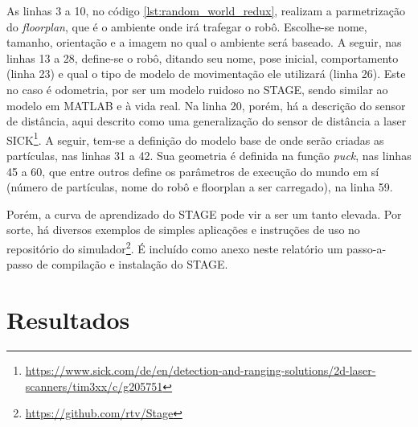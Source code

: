 \documentclass[
	12pt,				%
	openright,			%
	oneside,			%
	a4paper,			%
	english,			%
	french,				%
	spanish,			%
	brazil,				%
	]{abntex2}
\newcommand\todo[1]{~\newline{\color{red}\framebox[\columnwidth]{\parbox{.95\linewidth}{TODO: #1}}}~\newline}
\newcommand\todo[1]{}
\begin{document}
As linhas 3 a 10, no código \ref{lst:random_world_redux}, realizam a parmetrização do \emph{floorplan}, que é o ambiente onde irá trafegar o robô. Escolhe-se nome, tamanho, orientação e a imagem no qual o ambiente será baseado. A seguir, nas linhas 13 a 28, define-se o robô, ditando seu nome, pose inicial, comportamento (linha 23) e qual o tipo de modelo de movimentação ele utilizará (linha 26). Este no caso é odometria, por ser um modelo ruidoso no STAGE, sendo similar ao modelo em MATLAB e à vida real. Na linha 20, porém, há a descrição do sensor de distância, aqui descrito como uma generalização do sensor de distância a laser SICK\footnote{\url{https://www.sick.com/de/en/detection-and-ranging-solutions/2d-laser-scanners/tim3xx/c/g205751}}. A seguir, tem-se a definição do modelo base de onde serão criadas as partículas, nas linhas 31 a 42. Sua geometria é definida na função \emph{puck}, nas linhas 45 a 60, que entre outros define os parâmetros de execução do mundo em sí (número de partículas, nome do robô e floorplan a ser carregado), na linha 59.\par

Porém, a curva de aprendizado do STAGE pode vir a ser um tanto elevada. Por sorte, há diversos exemplos de simples aplicações e instruções de uso no repositório do simulador\footnote{\url{https://github.com/rtv/Stage}}. É incluído como anexo neste relatório um passo-a-passo de compilação e instalação do STAGE.



\chapter[Resultados]{Resultados}
\label{sec:results}
\end{document}
